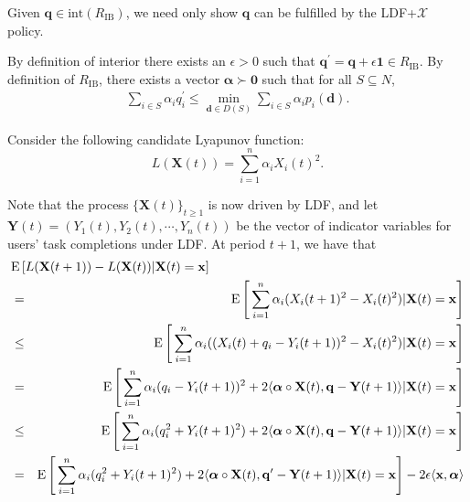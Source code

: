 \documentclass[prodmode,acmtompecs]{acmsmall}
\newcommand{\reqvec}{\mathbf{q}}
\newcommand{\reqscalar}{q}
\newcommand{\ribvec}{\boldsymbol{\alpha}}
\newcommand{\ribscalar}{\alpha}
\newcommand{\fullUserSet}{N}
\begin{document}
Given $\reqvec \in \text{int}(R_\text{IB})$, we need only show $\reqvec$ can be fulfilled by the LDF+$\mathcal{X}$ policy. 

By definition of interior there exists an $\epsilon>0$ such that ${\reqvec}^\prime = \reqvec + \epsilon\mathbf{1} \in R_{\text{IB}}$. 
By definition of $R_{\text{IB}}$, there exists a vector $\ribvec \succ \mathbf{0}$ such that for all $S \subseteq \fullUserSet$, 
\begin{align}
\label{align_q_prime_condition}
\sum\limits_{i\in S} \ribscalar_i {\reqscalar}^\prime_i \leq \min\limits_{\mathbf{d} \in D(S)} \sum\limits_{i\in S} {\ribscalar}_i p_i(\mathbf{d}). 
\end{align}

Consider the following candidate Lyapunov function: 
$$
L(\mathbf{X}(t)) = \sum\limits_{i=1}^{n} {\ribscalar}_i  X_i(t)^2. 
$$

Note that the process $\{\mathbf{X}(t)\}_{t\geq 1}$ is now driven by LDF, and let $\mathbf{Y}(t) = (Y_1(t), Y_2(t), \cdots, Y_n(t))$ be the vector of indicator variables for users' task completions under LDF. 
At period $t+1$, we have that
\begin{eqnarray}
\lefteqn{\expectation\left[L(\mathbf{X}(t+1)) - L(\mathbf{X}(t)) | \mathbf{X}(t) = \mathbf{x}\right]} \notag \\
& = & \expectation\Bigg[\sum\limits_{i=1}^{n} {\ribscalar}_i  (X_i(t+1)^2 - X_i(t)^2) | \mathbf{X}(t) = \mathbf{x}\Bigg]	\notag	\\
& \leq & \expectation\Bigg[\sum\limits_{i=1}^{n} {\ribscalar}_i  ((X_i(t) + \reqscalar_i \notag - Y_i(t+1))^2 - X_i(t)^2) | \mathbf{X}(t) = \mathbf{x}\Bigg] \notag \\
& = & \expectation\Bigg[\sum\limits_{i=1}^{n} {\ribscalar}_i  (\reqscalar_i - Y_i(t+1))^2 + 2 \langle \ribvec   \circ \mathbf{X}(t), \reqvec - \mathbf{Y}(t+1) \rangle | \mathbf{X}(t) = \mathbf{x}\Bigg] 	\notag \\
& \leq & \expectation\Bigg[\sum\limits_{i=1}^{n} {\ribscalar}_i  (\reqscalar_i^2 + Y_i(t+1)^2) + 2 \langle \ribvec   \circ \mathbf{X}(t), \reqvec - \mathbf{Y}(t+1) \rangle | \mathbf{X}(t) = \mathbf{x} \Bigg] 	\notag \\ 
& = & \expectation \Bigg[ \sum\limits_{i=1}^{n} {\ribscalar}_i  (\reqscalar_i^2 + Y_i(t+1)^2) + 2\langle \ribvec   \circ \mathbf{X}(t), {\reqvec}^\prime - \mathbf{Y}(t+1) \rangle | \mathbf{X}(t) = \mathbf{x}\Bigg] - 2\epsilon\langle \mathbf{x}, \ribvec \rangle	\label{align_LDF_drift}
\end{eqnarray}
\end{document}
